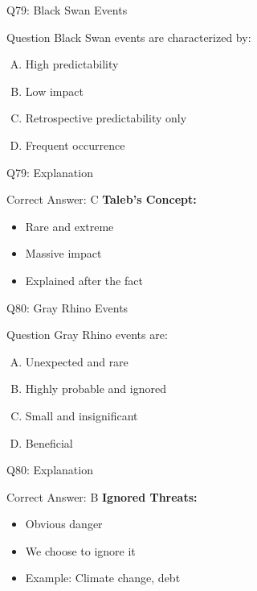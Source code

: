 \documentclass{beamer}
\begin{document}
			\begin{frame}{Q79: Black Swan Events}
				\begin{block}{Question}
					Black Swan events are characterized by:
				\end{block}
				\begin{enumerate}[(A)]
					\item High predictability
					\item Low impact
					\item Retrospective predictability only
					\item Frequent occurrence
				\end{enumerate}
			\end{frame}
			\begin{frame}{Q79: Explanation}
				\begin{block}{Correct Answer: C}
					\textbf{Taleb's Concept:}
					\begin{itemize}
						\item Rare and extreme
						\item Massive impact
						\item Explained after the fact
					\end{itemize}
				\end{block}
			\end{frame}
			
			\begin{frame}{Q80: Gray Rhino Events}
				\begin{block}{Question}
					Gray Rhino events are:
				\end{block}
				\begin{enumerate}[(A)]
					\item Unexpected and rare
					\item Highly probable and ignored
					\item Small and insignificant
					\item Beneficial
				\end{enumerate}
			\end{frame}
			\begin{frame}{Q80: Explanation}
				\begin{block}{Correct Answer: B}
					\textbf{Ignored Threats:}
					\begin{itemize}
						\item Obvious danger
						\item We choose to ignore it
						\item Example: Climate change, debt
					\end{itemize}
				\end{block}
			\end{frame}
			
\end{document}
